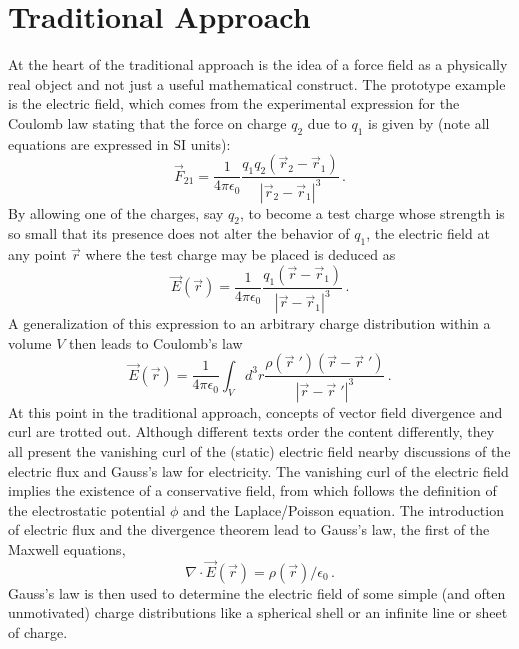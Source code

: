 \documentclass{article}
\begin{document}
\section{Traditional Approach}

At the heart of the traditional approach is the idea of a force field as a physically real object and not 
just a useful mathematical construct.  The prototype example is the electric field, which comes from 
the experimental expression for the Coulomb law stating that the force on charge $q_2$ due to $q_1$ is given by 
(note all equations are expressed in SI units):
\begin{equation}
  \vec F_{21} = \frac{1}{4 \pi \epsilon_0} \frac{ q_1 q_2 \left( \vec r_2 - \vec r_1 \right) }{|\vec r_2 - \vec r_1|^3} \, .
\end{equation}
By allowing one of the charges, say $q_2$, to become a test charge whose strength is so small that 
its presence does not alter the behavior of $q_1$, the electric field at any point $\vec r$ where the 
test charge may be placed is deduced as
\begin{equation}
\vec E(\vec r) = \frac{1}{4 \pi \epsilon_0} \frac{q_1 \left( \vec r - \vec r_1 \right) }{|\vec r - \vec r_1|^3} \, .
\end{equation}
A generalization of this expression to an arbitrary charge distribution within a volume $V$ then leads to Coulomb’s law 
\begin{equation}\label{C_law}
\vec E(\vec r) = \frac{1}{4 \pi \epsilon_0} \int_V d^3 r \frac{ \rho(\vec r \;') \left( \vec r - \vec r \; ' \right) }{|\vec r - \vec r \; '|^3} \, .
\end{equation}
At this point in the traditional approach, concepts of vector field divergence and curl are trotted out.  
Although different texts order the content differently, they all present the vanishing curl of the (static) electric 
field nearby discussions of the electric flux and Gauss's law for electricity.  The vanishing curl of the electric 
field implies the existence of a conservative field, from which follows the definition of the electrostatic 
potential $\phi$ and the Laplace/Poisson equation.  The introduction of electric flux and the divergence theorem 
lead to Gauss's law, the first of the Maxwell equations, 
\begin{equation}\label{G_law}
\nabla \cdot \vec E (\vec r) = \rho(\vec r) / \epsilon_0 \, .
\end{equation}
Gauss's law is then used to determine the electric field of some simple (and often unmotivated) charge 
distributions like a spherical shell or an infinite line or sheet of charge.
\end{document}
